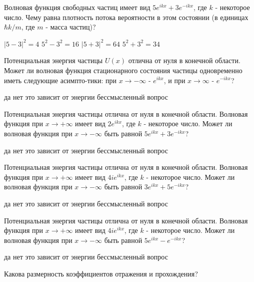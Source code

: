 \documentclass[11pt,a4paper]{exam}
\begin{document}
\begin{questions}
\question Волновая функция свободных частиц имеет вид $5{e^{ikx}} + 3{e^{ - ikx}}$, где $k$ - некоторое число. Чему равна плотность потока вероятности в этом состоянии (в единицах $\hbar k/m$, где $m$ - масса частиц)?
\begin{choices}
\choice $|5 - 3{|^2} = 4$    
\choice ${5^2} - {3^2} = 16$    
\choice $|5 + 3{|^2} = 64$         
\choice ${5^2} + {3^2} = 34$ 
\end{choices}

\question Потенциальная энергия частицы $U(x)$ отлична от нуля в конечной области. Может ли волновая функция стационарного состояния частицы одновременно иметь следующие асимпто-тики: при $x \to  - \infty $ - ${e^{ikx}}$, и при $x \to \infty $ - ${e^{ - ikx}}$?
\begin{choices}
\choice да             
\choice нет      
\choice это зависит от энергии     
\choice бессмысленный вопрос
\end{choices}

\question Потенциальная энергия частицы отлична от нуля в конечной области. Волновая функция при $x \to  + \infty $ имеет вид $2{e^{ikx}}$, где $k$ - некоторое число. Может ли волновая функция при $x \to  - \infty $ быть равной $5{e^{ikx}} + 3{e^{ - ikx}}$?
\begin{choices}
\choice да             
\choice нет
\choice это зависит от энергии     
\choice бессмысленный вопрос
\end{choices}

\question Потенциальная энергия частицы отлична от нуля в конечной области. Волновая функция при $x \to  + \infty $ имеет вид $4i{e^{ikx}}$, где $k$ - некоторое число. Может ли волновая функция при $x \to  - \infty $ быть равной $3{e^{ikx}} + 5{e^{ - ikx}}$?
\begin{choices}
\choice да             
\choice нет
\choice это зависит от энергии     
\choice бессмысленный вопрос
\end{choices}

\question Потенциальная энергия частицы отлична от нуля в конечной области. Волновая функция при $x \to  + \infty $ имеет вид $4i{e^{ikx}}$, где $k$ - некоторое число. Может ли волновая функция при $x \to  - \infty $ быть равной $5{e^{ikx}} - {e^{ - ikx}}$?
\begin{choices}
\choice да             
\choice нет
\choice это зависит от энергии     
\choice бессмысленный вопрос
\end{choices}

\question Какова размерность коэффициентов отражения и прохождения?
\begin{choices}
\choice       
\choice       
\choice       
\choice 
\end{choices}


\end{questions}
\end{document}
